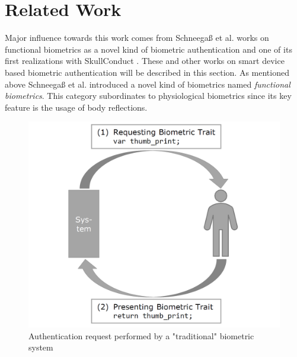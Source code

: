 \section{Related Work}
Major influence towards this work comes from Schneegaß et al. works on functional biometrics as a novel kind of biometric authentication \cite{schneegass2020functbiometric} and one of its first realizations with SkullConduct \cite{SkullConduct}. These and other works on smart device based biometric authentication will be described in this section.\newline
As mentioned above Schneegaß et al. introduced a novel kind of biometrics named \textit{functional  biometrics}. This category subordinates to physiological biometrics since its key feature is the usage of body reflections.
\begin{figure}[ht]
	\centering
	\begin{minipage}[h]{.45\linewidth}
		\centering
		\includegraphics[width=\textwidth]{biometric_trad.png}
		\caption{Authentication request performed by a "traditional" biometric system}
		\label{fig:tradBiom}
	\end{minipage}
	\hspace{0.5cm}
	\begin{minipage}[h]{.45\linewidth}
		\centering

\end{minipage}
\end{figure}
